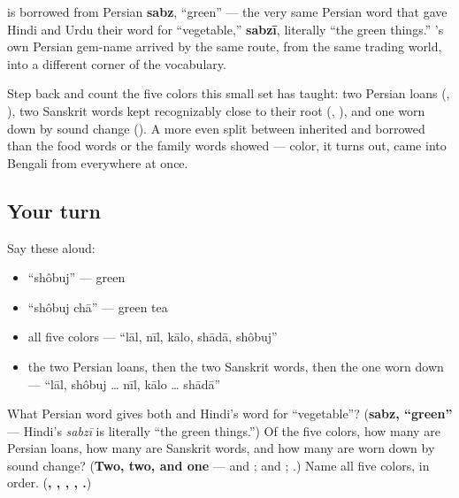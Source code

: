 \begin{cousinweb}
\textbf{} is borrowed from Persian \textbf{sabz}, \textquotedblleft{}green\textquotedblright{} — the very same Persian word that gave Hindi and Urdu their word for \textquotedblleft{}vegetable,\textquotedblright{} \textbf{sabzī}, literally \textquotedblleft{}the green things.\textquotedblright{} 's own Persian gem-name arrived by the same route, from the same trading world, into a different corner of the vocabulary.

Step back and count the five colors this small set has taught: two Persian loans (\textbf{}, \textbf{}), two Sanskrit words kept recognizably close to their root (\textbf{}, \textbf{}), and one worn down by sound change (\textbf{}). A more even split between inherited and borrowed than the food words or the family words showed — color, it turns out, came into Bengali from everywhere at once.
\end{cousinweb}

\subsection*{Your turn}
Say these aloud:

\begin{itemize}
\raggedright
  \item \textquotedblleft{}shôbuj\textquotedblright{} — green
  \item \textquotedblleft{}shôbuj chā\textquotedblright{} — green tea
  \item all five colors — \textquotedblleft{}lāl, nīl, kālo, shādā, shôbuj\textquotedblright{}
  \item the two Persian loans, then the two Sanskrit words, then the one worn down — \textquotedblleft{}lāl, shôbuj … nīl, kālo … shādā\textquotedblright{}
\end{itemize}

\begin{tcolorbox}[breakable,colback=teal!4,colframe=teal!35!black,title={Before you move on}]
What Persian word gives both  and Hindi's word for \textquotedblleft{}vegetable\textquotedblright{}? (\textbf{sabz, \textquotedblleft{}green\textquotedblright{}} — Hindi's \emph{sabzī} is literally \textquotedblleft{}the green things.\textquotedblright{}) Of the five colors, how many are Persian loans, how many are Sanskrit words, and how many are worn down by sound change? (\textbf{Two, two, and one} —  and ;  and ; .) Name all five colors, in order. (\textbf{, , , , .})
\end{tcolorbox}
